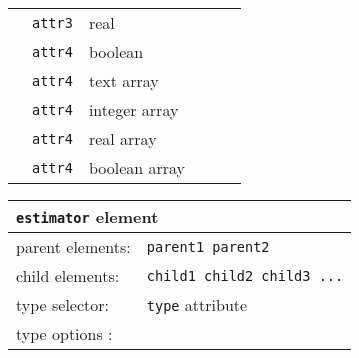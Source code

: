 \begin{table}[h]
\begin{center}
\begin{tabularx}{\textwidth}{l l l l l l }
   &   \texttt{attr3}     &  real              &                  &                     &                       \\
   &   \texttt{attr4}     &  boolean           &                  &                     &                       \\
   &   \texttt{attr4}     &  text array        &                  &                     &                       \\
   &   \texttt{attr4}     &  integer array     &                  &                     &                       \\
   &   \texttt{attr4}     &  real array        &                  &                     &                       \\
   &   \texttt{attr4}     &  boolean array     &                  &                     &                       \\
  \hline
\end{tabularx}
\end{center}
\end{table}






\begin{table}[h]
\begin{center}
\begin{tabularx}{\textwidth}{l l l l l l }
\hline
\multicolumn{6}{l}{\texttt{estimator} element} \\
\hline
\multicolumn{2}{l}{parent elements:} & \multicolumn{4}{l}{\texttt{parent1 parent2}}\\
\multicolumn{2}{l}{child  elements:} & \multicolumn{4}{l}{\texttt{child1 child2 child3 ...}}\\
\multicolumn{2}{l}{type   selector:} & \multicolumn{4}{l}{\texttt{type} attribute}\\
\multicolumn{2}{l}{type   options :} & \multicolumn{4}{l}{}\\
  \hline
\end{tabularx}
\end{center}
\end{table}



